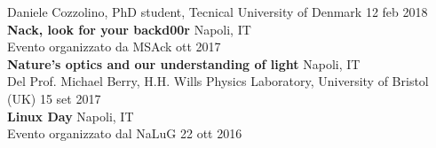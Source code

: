 \documentclass[a4paper]{article}
\begin{document}
Daniele Cozzolino, PhD student, Tecnical University of Denmark
\hfill 12 feb 2018 \\
\vspace*{2mm}
\textbf{Nack, look for your backd00r} \hfill Napoli, IT \\
Evento organizzato da MSAck \hfill ott 2017  \\
\vspace*{2mm}
\textbf{Nature's optics and our understanding of light} \hfill Napoli, IT \\
Del Prof. Michael Berry,
H.H. Wills Physics Laboratory,
University of Bristol (UK) \hfill 15 set 2017 \\
\vspace*{2mm}
\textbf{Linux Day} \hfill Napoli, IT \\
Evento organizzato dal NaLuG \hfill 22 ott 2016 \\
\vspace*{2mm}
\end{document}

